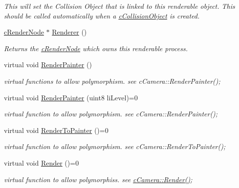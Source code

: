 \begin{DoxyCompactItemize}
\begin{DoxyCompactList}\small\item\em This will set the Collision Object that is linked to this renderable object. This should be called automatically when a \hyperlink{classc_collision_object}{cCollisionObject} is created. \item\end{DoxyCompactList}\item 
\hyperlink{classc_render_node}{cRenderNode} $\ast$ \hyperlink{classc_render_object_a8edb3b47e07b01d11aae96f078b9f63f}{Renderer} ()
\begin{DoxyCompactList}\small\item\em Returns the \hyperlink{classc_render_node}{cRenderNode} which owns this renderable process. \item\end{DoxyCompactList}\item 
virtual void \hyperlink{classc_render_object_ab2a666638043054e563b9f0a54faa6b7}{RenderPainter} ()
\begin{DoxyCompactList}\small\item\em virtual functions to allow polymorphism. see cCamera::RenderPainter(); \item\end{DoxyCompactList}\item 
virtual void \hyperlink{classc_render_object_a16beccc30dfea79c3988508c1420d54b}{RenderPainter} (uint8 liLevel)=0
\begin{DoxyCompactList}\small\item\em virtual function to allow polymorphism. see cCamera::RenderPainter(); \item\end{DoxyCompactList}\item 
virtual void \hyperlink{classc_render_object_a130139cc8e1f5219ddabc6192f98afa8}{RenderToPainter} ()=0
\begin{DoxyCompactList}\small\item\em virtual function to allow polymorphism. see cCamera::RenderToPainter(); \item\end{DoxyCompactList}\item 
virtual void \hyperlink{classc_render_object_ab0db1b7db1a1d4210511d9d95634fcce}{Render} ()=0
\begin{DoxyCompactList}\small\item\em virtual function to allow polymorphiss. see \hyperlink{classc_camera_acfe96d0953540fa3938e4d415d7cb791}{cCamera::Render()}; \item\end{DoxyCompactList}\item 

\end{DoxyCompactItemize}
